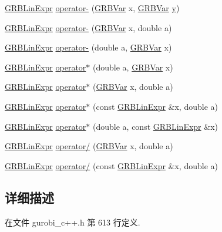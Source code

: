 \begin{DoxyCompactItemize}
\item 
\hyperlink{classGRBLinExpr}{G\+R\+B\+Lin\+Expr} \hyperlink{classGRBLinExpr_a00944c21db97e06c57a32a8a44b17fcb}{operator-\/} (\hyperlink{classGRBVar}{G\+R\+B\+Var} x, \hyperlink{classGRBVar}{G\+R\+B\+Var} \hyperlink{classes_8txt_a52673b1e0cce0104e52dcd12727f211e}{y})
\item 
\hyperlink{classGRBLinExpr}{G\+R\+B\+Lin\+Expr} \hyperlink{classGRBLinExpr_a1c6d619403b25212a24e445d35692d08}{operator-\/} (\hyperlink{classGRBVar}{G\+R\+B\+Var} x, double a)
\item 
\hyperlink{classGRBLinExpr}{G\+R\+B\+Lin\+Expr} \hyperlink{classGRBLinExpr_a9e69f993bbdb9da3c094f3b6913c8c20}{operator-\/} (double a, \hyperlink{classGRBVar}{G\+R\+B\+Var} x)
\item 
\hyperlink{classGRBLinExpr}{G\+R\+B\+Lin\+Expr} \hyperlink{classGRBLinExpr_a2e9c9bf7dda6aa982287c8f3f99ef943}{operator$\ast$} (double a, \hyperlink{classGRBVar}{G\+R\+B\+Var} x)
\item 
\hyperlink{classGRBLinExpr}{G\+R\+B\+Lin\+Expr} \hyperlink{classGRBLinExpr_afbfcc44d81eac4b5898f9dbfca6e1a2a}{operator$\ast$} (\hyperlink{classGRBVar}{G\+R\+B\+Var} x, double a)
\item 
\hyperlink{classGRBLinExpr}{G\+R\+B\+Lin\+Expr} \hyperlink{classGRBLinExpr_ade32ef36fef6dfa0b9fa542ea425d775}{operator$\ast$} (const \hyperlink{classGRBLinExpr}{G\+R\+B\+Lin\+Expr} \&x, double a)
\item 
\hyperlink{classGRBLinExpr}{G\+R\+B\+Lin\+Expr} \hyperlink{classGRBLinExpr_a49ea44a25db94396a530a8ad89114a36}{operator$\ast$} (double a, const \hyperlink{classGRBLinExpr}{G\+R\+B\+Lin\+Expr} \&x)
\item 
\hyperlink{classGRBLinExpr}{G\+R\+B\+Lin\+Expr} \hyperlink{classGRBLinExpr_ab9ee71ce5a0f6cb380df2ef3c5d42370}{operator/} (\hyperlink{classGRBVar}{G\+R\+B\+Var} x, double a)
\item 
\hyperlink{classGRBLinExpr}{G\+R\+B\+Lin\+Expr} \hyperlink{classGRBLinExpr_aa1b365e3f8c7f2f13fb4c9d335b7e79b}{operator/} (const \hyperlink{classGRBLinExpr}{G\+R\+B\+Lin\+Expr} \&x, double a)
\end{DoxyCompactItemize}


\subsection{详细描述}


在文件 gurobi\+\_\+c++.\+h 第 613 行定义.



